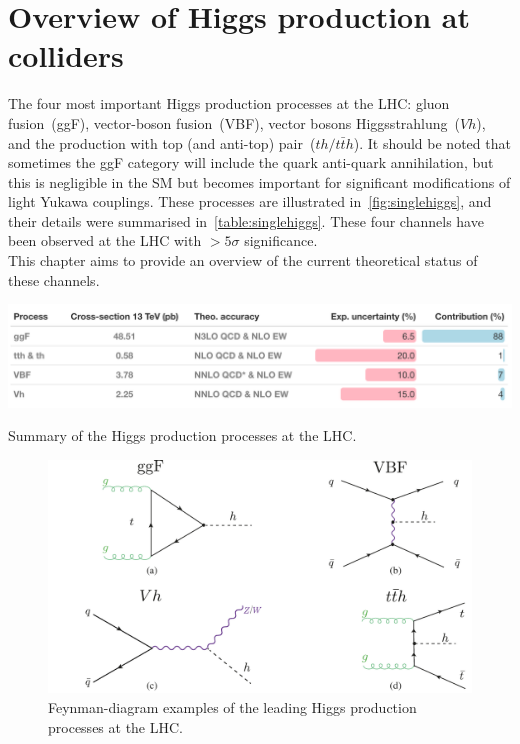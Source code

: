 
\chapter{ Overview of Higgs production at colliders }\label{chap:overviewSingleHiggs}
The four most important Higgs production processes at the LHC: gluon fusion~(ggF), vector-boson fusion~(VBF), vector bosons Higgsstrahlung~($Vh$), and the production with top (and anti-top) pair~($th / t \bar th$). It should be noted that sometimes the ggF category will include the quark anti-quark annihilation, but this is negligible in the SM but becomes important for significant modifications of light Yukawa couplings. These processes are illustrated in~\autoref{fig:singlehiggs}, and their details were summarised in~\autoref{table:singlehiggs}. These four channels have been observed at the LHC with $>5 \sigma$ significance. \\ 
This chapter aims to provide an overview of the current theoretical status of these channels.
\begin{table}[htbp!]
	\includegraphics[width=1\textwidth]{single_higgs_table}
	\caption{ Summary of the Higgs production processes at the LHC. \label{table:singlehiggs} }
\end{table}
\begin{figure}[htbp!]
	\begin{center}
		\includegraphics[width=.75\textwidth]{figures/single_higgs}
		\caption{Feynman-diagram examples of the leading Higgs production processes  at the LHC. \label{fig:singlehiggs} }
	\end{center}
\end{figure}
